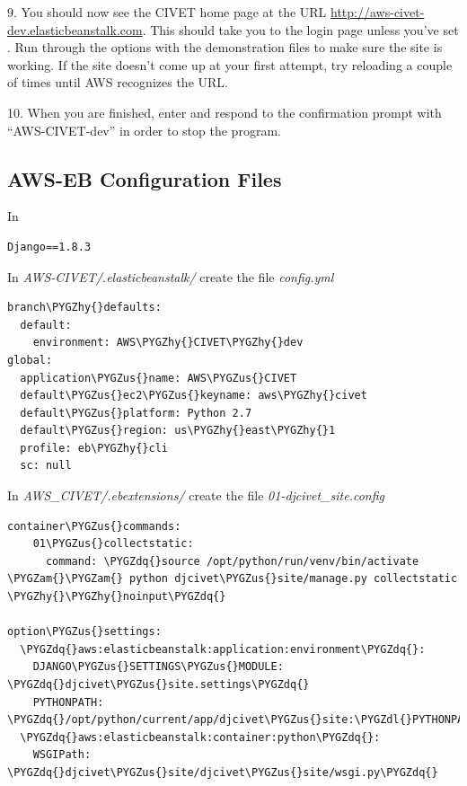 \documentclass[letterpaper,10pt,english]{sphinxmanual}
\def\PYGZus{\char`\_}
\def\PYGZam{\char`\&}
\def\PYGZdl{\char`\$}
\def\PYGZhy{\char`\-}
\def\PYGZdq{\char`\"}
\begin{document}
9. You should now see the CIVET home page at the URL \href{http://aws-civet-dev.elasticbeanstalk.com}{http://aws-civet-dev.elasticbeanstalk.com}. This should take you to the
login page unless you've set . Run through the options with the demonstration files to make sure
the site is working. If the site doesn't come up at your first attempt, try reloading a couple of times until AWS
recognizes the URL.

10. When you are finished, enter  and respond to the confirmation prompt with “AWS-CIVET-dev” in order to
stop the program.


\subsection{AWS-EB Configuration Files}
\label{appendix4:aws-eb-configuration-files}
In

\begin{Verbatim}[commandchars=\\\{\}]
Django==1.8.3
\end{Verbatim}

In \emph{AWS-CIVET/.elasticbeanstalk/} create the file \emph{config.yml}

\begin{Verbatim}[commandchars=\\\{\}]
branch\PYGZhy{}defaults:
  default:
    environment: AWS\PYGZhy{}CIVET\PYGZhy{}dev
global:
  application\PYGZus{}name: AWS\PYGZus{}CIVET
  default\PYGZus{}ec2\PYGZus{}keyname: aws\PYGZhy{}civet
  default\PYGZus{}platform: Python 2.7
  default\PYGZus{}region: us\PYGZhy{}east\PYGZhy{}1
  profile: eb\PYGZhy{}cli
  sc: null
\end{Verbatim}

In \emph{AWS\_CIVET/.ebextensions/} create the file \emph{01-djcivet\_site.config}

\begin{Verbatim}[commandchars=\\\{\}]
container\PYGZus{}commands:
    01\PYGZus{}collectstatic:
      command: \PYGZdq{}source /opt/python/run/venv/bin/activate \PYGZam{}\PYGZam{} python djcivet\PYGZus{}site/manage.py collectstatic \PYGZhy{}\PYGZhy{}noinput\PYGZdq{}

option\PYGZus{}settings:
  \PYGZdq{}aws:elasticbeanstalk:application:environment\PYGZdq{}:
    DJANGO\PYGZus{}SETTINGS\PYGZus{}MODULE: \PYGZdq{}djcivet\PYGZus{}site.settings\PYGZdq{}
    PYTHONPATH: \PYGZdq{}/opt/python/current/app/djcivet\PYGZus{}site:\PYGZdl{}PYTHONPATH\PYGZdq{}
  \PYGZdq{}aws:elasticbeanstalk:container:python\PYGZdq{}:
    WSGIPath: \PYGZdq{}djcivet\PYGZus{}site/djcivet\PYGZus{}site/wsgi.py\PYGZdq{}
\end{Verbatim}
\end{document}
